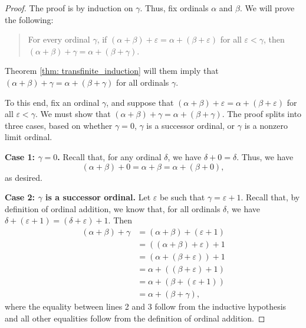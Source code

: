 \documentclass[a4paper]{memoir}
\theoremstyle{definition}
\begin{document}
\begin{proof}
  The proof is by induction on $\gamma$. Thus, fix ordinals $\alpha$ and $\beta$. We will prove 
  the following:
  \begin{quote}
    For every ordinal $\gamma$, if $(\alpha + \beta) + \varepsilon = \alpha + (\beta + \varepsilon)$ 
    for all $\varepsilon < \gamma$, then $(\alpha + \beta) + \gamma = \alpha + (\beta + \gamma)$.
  \end{quote}
  Theorem \ref{thm: transfinite_induction} will them imply that $(\alpha + \beta) + \gamma = 
  \alpha + (\beta + \gamma)$ for all ordinals $\gamma$. 
  
  To this end, fix an ordinal $\gamma$, and suppose that $(\alpha + \beta) + \varepsilon = 
  \alpha + (\beta + \varepsilon)$ for all $\varepsilon < \gamma$. We must show that 
  $(\alpha + \beta) + \gamma = \alpha + (\beta + \gamma)$. The proof splits into three cases, 
  based on whether $\gamma = 0$, $\gamma$ is a successor ordinal, or $\gamma$ is a nonzero 
  limit ordinal.
  
  \textbf{Case 1: $\gamma = 0$.} Recall that, for any ordinal $\delta$, we have $\delta + 0 = \delta$. 
  Thus, we have
  \[
    (\alpha + \beta) + 0 = \alpha + \beta = \alpha + (\beta + 0),
  \]
  as desired.
  
  \textbf{Case 2: $\gamma$ is a successor ordinal.} Let $\varepsilon$ be such that 
  $\gamma = \varepsilon + 1$. Recall that, by definition of ordinal addition, we know that, 
  for all ordinals $\delta$, we have $\delta + (\varepsilon + 1) = (\delta + \varepsilon) + 1$. Then
  \begin{align*}
    (\alpha + \beta) + \gamma &= (\alpha + \beta) + (\varepsilon + 1) \\ 
    &= ((\alpha + \beta) + \varepsilon) + 1 \\ 
    &= (\alpha + (\beta + \varepsilon)) + 1 \\ 
    &= \alpha + ((\beta + \varepsilon) + 1) \\ 
    &= \alpha + (\beta + (\varepsilon + 1)) \\ 
    &= \alpha + (\beta + \gamma),
  \end{align*}
  where the equality between lines 2 and 3 follow from the inductive hypothesis and all other equalities 
  follow from the definition of ordinal addition.
  

\end{proof}
\end{document}
